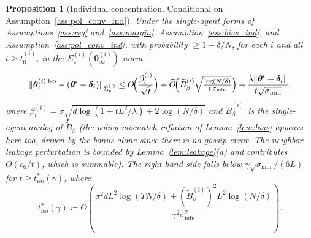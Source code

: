 \documentclass[11pt]{article}
\newtheorem{proposition}[theorem]{Proposition}
\newcommand{\Ot}{\widetilde{O}}
\begin{document}
\begin{proposition}[Individual concentration. Conditional on
Assumption~\ref{ass:pol_conv_ind}]\label{prop:conc_ind}
Under the single-agent forms of Assumptions~\ref{ass:reg}
and~\ref{ass:margin}, Assumption~\ref{ass:bias_ind}, and
Assumption~\ref{ass:pol_conv_ind},
with probability $\geq 1-\delta/N$, for each $i$ and all
$t\geq t_0^{(i)}$, in the
$\Sigma_z^{(i)}(\bm{\theta}_\infty^{(i)})$-norm \[
\|\bm{\theta}_t^{(i),\mathrm{iso}}-(\bm{\theta}^{\!*}+\bm{\delta}_i)\|_{\Sigma_z^{(i)}}
\leq O\!\Bigl(\frac{\beta_t^{(i)}}{\sqrt t}\Bigr)
+\Ot\!\Bigl(\widetilde B_\beta^{(i)}
\sqrt{\tfrac{\log(N/\delta)}{t\,\sigma_{\min}}}\Bigr)
+\frac{\lambda\|\bm{\theta}^{\!*}+\bm{\delta}_i\|}{t\sqrt{\sigma_{\min}}},
\]
where $\beta_t^{(i)}=\sigma\sqrt{d\log(1+tL^2/\lambda)+2\log(N/\delta)}$
and $\widetilde B_\beta^{(i)}$ is the single-agent analog of
$\widetilde B_\beta$ (the policy-mismatch inflation of
Lemma~\ref{lem:bias} appears here too, driven by the bonus alone since
there is no gossip error. The neighbor-leakage perturbation is bounded
by Lemma~\ref{lem:leakage}(a) and contributes $O(c_0/t)$, which is
summable).
The right-hand side falls below
$\gamma\sqrt{\sigma_{\min}}/(6L)$ for
$t\geq t_{\mathrm{iso}}^*(\gamma)$, where
\begin{equation}
t_{\mathrm{iso}}^*(\gamma)\coloneqq
\Theta\!\left(\frac{\sigma^2 dL^2\log(TN/\delta)+(\widetilde B_\beta^{(i)})^2 L^2\log(N/\delta)}
{\gamma^2\sigma_{\min}^2}\right).
\label{eq:tiso_star}
\end{equation}
\end{proposition}
\end{document}
